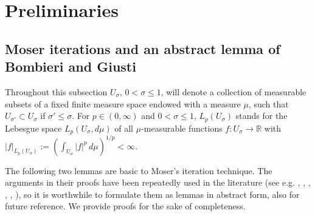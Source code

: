 \documentclass[10pt]{article}
\newcommand{\iR}{\mathbb{R}}
\begin{document}
\section{Preliminaries}
\subsection{Moser iterations and an abstract lemma of Bombieri and Giusti}
Throughout this subsection $U_\sigma$, $0<\sigma\le 1$, will denote
a collection of measurable subsets of a fixed finite measure space
endowed with a measure $\mu$, such that $U_{\sigma'}\subset
U_\sigma$ if $\sigma'\le \sigma$. For $p\in (0,\infty)$ and
$0<\sigma\le 1$, $L_p(U_\sigma)$ stands for the Lebesgue space
$L_p(U_\sigma,d\mu)$ of all $\mu$-measurable functions
$f:U_\sigma\rightarrow \iR$ with
$|f|_{L_p(U_\sigma)}:=(\int_{U_\sigma}|f|^p\,d\mu)^{1/p}<\infty$.

The following two lemmas are basic to Moser's iteration technique.
The arguments in their proofs have been repeatedly used in the
literature (see e.g. \cite{GilTrud}, \cite{Lm}, \cite{Mosell},
\cite{Moser64}, \cite{SalCoste}, \cite{Trud}), so it is worthwhile
to formulate them as lemmas in abstract form, also for future
reference. We provide proofs for the sake of completeness.
\end{document}
